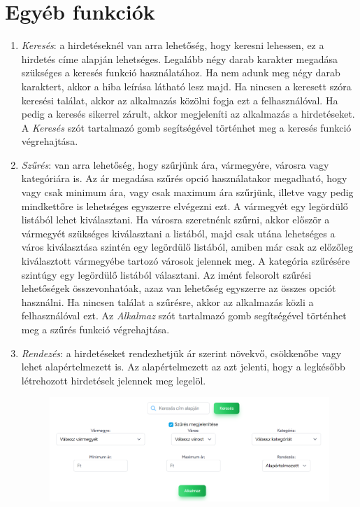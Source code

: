 \documentclass[]{thesis-ekf}
\theoremstyle{definition}
\theoremstyle{remark}
\begin{document}
	\section{Egyéb funkciók}\label{egyeb-funkciok}
		\begin{enumerate}
			\item \emph{Keresés}: a hirdetéseknél van arra lehetőség, hogy keresni lehessen, ez a hirdetés címe alapján lehetséges. Legalább négy darab karakter megadása szükséges a keresés funkció használatához. Ha nem adunk meg négy darab karaktert, akkor a hiba leírása látható lesz majd. Ha nincsen a keresett szóra keresési találat, akkor az alkalmazás közölni fogja ezt a felhasználóval. Ha pedig a keresés sikerrel zárult, akkor megjeleníti az alkalmazás a hirdetéseket. A \emph{Keresés} szót tartalmazó gomb segítségével történhet meg a keresés funkció végrehajtása.
			\item \emph{Szűrés}: van arra lehetőség, hogy szűrjünk ára, vármegyére, városra vagy kategóriára is. Az ár megadása szűrés opció használatakor megadható, hogy vagy csak minimum ára, vagy csak maximum ára szűrjünk, illetve vagy pedig mindkettőre is lehetséges egyszerre elvégezni ezt. A vármegyét egy legördülő listából lehet kiválasztani. Ha városra szeretnénk szűrni, akkor először a vármegyét szükséges kiválasztani a listából, majd csak utána lehetséges a város kiválasztása szintén egy legördülő listából, amiben már csak az előzőleg kiválasztott vármegyébe tartozó városok jelennek meg. A kategória szűrésére szintúgy egy legördülő listából választani. Az imént felsorolt szűrési lehetőségek összevonhatóak, azaz van lehetőség egyszerre az összes opciót használni. Ha nincsen találat a szűrésre, akkor az alkalmazás közli a felhasználóval ezt. Az \emph{Alkalmaz} szót tartalmazó gomb segítségével történhet meg a szűrés funkció végrehajtása.
			\item \emph{Rendezés}: a hirdetéseket rendezhetjük ár szerint növekvő, csökkenőbe vagy lehet alapértelmezett is. Az alapértelmezett az azt jelenti, hogy a legkésőbb létrehozott hirdetések jelennek meg legelöl.
				\begin{figure}[ht!]
				\centering
				\includegraphics[width=13cm]{./felhasznaloi/kereses-szures}

\end{figure}
\end{enumerate}
\end{document}
